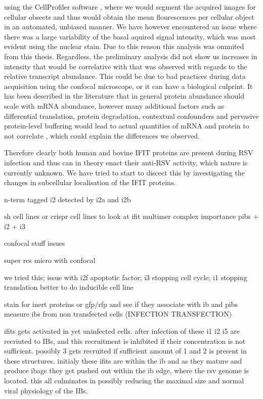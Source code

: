 using the CellProfiler software \cite{McQuin2018CellProfilerBiology}, where we would segment the acquired images for cellular obsects and thus would obtain the mean flourescences per cellular object in an automated, unbiased manner. We have however encountered an issue where there was a large variability of the basal aquired signal intensity, which was most evident using the nuclear stain. Due to this reason this analysis was ommited from this thesis. Regardless, the preliminary analysis did not show us increases in intensity that would be correlative with that was observed with regards to the relative transcript abundance. This could be due to bad practices during data acquisition using the confocal microscope, or it can have a biological culprint. It has been described in the literature that in general protein abundance should scale with mRNA abundance, however many additional factors such as differential translation, protein degradation, contextual confounders and pervasive protein-level buffering would lead to actual quantities of mRNA and protein to not correlate \cite{Liu2016OnAbundance, Buccitelli2020MRNAsControl}, which could explain the differences we observed.

Therefore clearly both human and bovine IFIT proteins are present during RSV infection and thus can in theory enact their anti-RSV activity, which nature is currently unknown. We have tried to start to discect this by investigating the changes in subcellular localisation of the IFIT proteins.



n-term tagged i2 detected by i2a and i2b

sh cell lines or crispr cell lines to look at ifit multimer complex importance
pibs + i2 + i3

confocal stuff issues

super res micro with confocal

we tried this; issue with i2f apoptotic factor; i3 stopping cell cycle; i1 stopping translation
better to do inducible cell line

stain for inert proteins or gfp/rfp and see if they associate with ib and pibs
measure ibs from non transfected cells (INFECTION TRANSFECTION)

ifits gets activated in yet uninfected cells. after infection of these i1 i2 i5 are recriuted to IBs, and this recruitment is inhibited if their concentration is not sufficient. possibly 3 gets recruited if sufficient amount of 1 and 2 is present in these structures. initialy these ifits are within the ib and as they mature and produce ibags they get pushed out within the ib edge, where the rsv genome is located. this all culminates in possibly reducing the maximal size and normal viral physiology of the IBs.


